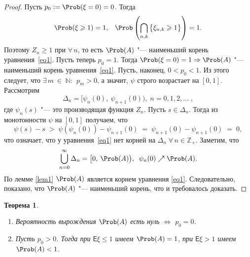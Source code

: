 \documentclass[a4paper]{article}
\newcommand{\Expect}{\mathsf{E}}
\theoremstyle{plain}
\newtheorem{thm}{Теорема}[section]
\theoremstyle{definition}
\theoremstyle{remark}
\begin{document}
\begin{proof}
  Пусть $p_{0} := \Prob(\xi = 0) = 0$. Тогда
  \begin{equation*}
    \Prob(\xi \geqslant 1) = 1{,}\quad \Prob\left(\bigcap_{n,k} \left\lbrace \xi_{n,k} \geqslant 1 \right\rbrace \right) = 1{.}
  \end{equation*}
  Поэтому $Z_{n} \geqslant 1$ при $\forall\, n$, то есть $\Prob(A)$ "--- наименьший корень уравнения~\eqref{eq1}.
  Пусть теперь $p_{0} = 1$. Тогда $\Prob(\xi = 0)=1 \Rightarrow \Prob(A)$ "--- наименьший корень уравнения~\eqref{eq1}.
  Пусть, наконец, $0 < p_{0} < 1$. Из этого следует, что $\exists\, m~\in~\mathbb{N}{:}\;\, p_{m} > 0$, а значит, $\psi$ строго возрастает на $[0, 1]$. Рассмотрим
  \begin{equation*}
    \Delta_{n} = \big[\psi_{n}(0),\: \psi_{n+1}\left(0\right)\big){,}\; n = 0, 1, 2, \ldots \; {,} %
  \end{equation*}
  где $\psi_{n}(s)$ "--- это производящая функция $Z_{n}$. Пусть $s \in \Delta_{n}$. Тогда из монотонности $\psi$ на $[0, 1]$ получаем, что
  \begin{equation*}
    \psi(s) - s \; > \; \psi(\psi_{n}(0)) - \psi_{n+1}(0) \; = \; \psi_{n+1}(0) - \psi_{n+1}(0) \; = \; 0{,}
  \end{equation*}
  что означает, что у уравнения~\eqref{eq1} нет корней на $\Delta_{n} \; \forall\, n \in \mathbb{Z_{+}}$.
  Заметим, что
  \begin{equation*}
    \bigcup_{n=0}^{\infty} \Delta_{n} = \big[0,\: \Prob(A)\big), \; \; \psi_{n}(0) \nearrow \Prob(A){.} %
  \end{equation*}
  По лемме \ref{lem1} $\Prob(A)$ является корнем уравнения \eqref{eq1}. Следовательно, показано, что $\Prob(A)$ "--- наименьший корень, что и требовалось доказать.
\end{proof}

\begin{thm} \mbox{}
 \begin{enumerate}
   \item\label{firth} Вероятность вырождения $\Prob(A)$ есть нуль $\Longleftrightarrow$ $p_{0} = 0$.
   \item\label{secth} Пусть $p_{0} > 0$. Тогда при $\Expect \xi \leqslant 1$ имеем $\Prob (A) = 1$, при $\Expect \xi > 1$ имеем $\Prob(A) < 1$.
 \end{enumerate}
\end{thm}
\end{document}

